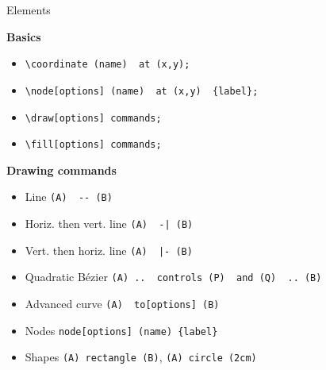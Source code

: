 \documentclass[aspectratio=169]{beamer}
\begin{document}
\begin{frame}[fragile]{Elements}

  {\bfseries Basics}
  \begin{itemize}
    \item \lstinline!\coordinate (name)  at (x,y);!
    \item \lstinline!\node[options] (name)  at (x,y)  {label};!
    \item \lstinline!\draw[options] commands;!
    \item \lstinline!\fill[options] commands;!
  \end{itemize}

  {\bfseries Drawing commands}
  \begin{itemize}
    \item Line \lstinline!(A)  -- (B)!
    \item Horiz. then vert. line \lstinline!(A)  -| (B)!
    \item Vert. then horiz. line \lstinline!(A)  |- (B)!
    \item Quadratic B\'ezier \lstinline!(A) ..  controls (P)  and (Q)  .. (B)!
    \item Advanced curve \lstinline!(A)  to[options] (B)!
    \item Nodes \lstinline!node[options] (name) {label}!
    \item Shapes \lstinline!(A) rectangle (B)!, \lstinline!(A) circle (2cm)!
  \end{itemize}
\end{frame}
\end{document}
